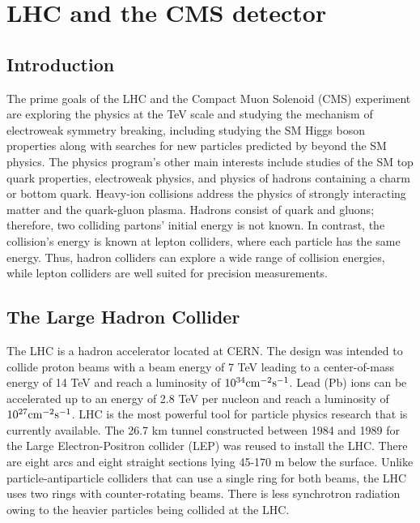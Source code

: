 %
%

\chapter{LHC and the CMS detector}
\label{chap:exper_setup}

\section{Introduction}

The prime goals of the LHC and the Compact Muon Solenoid (CMS) \cite{Chatrchyan:2008aa} experiment are exploring the physics at the TeV scale and studying the mechanism of electroweak symmetry breaking, including studying the SM Higgs boson properties along with searches for new particles predicted by beyond the SM physics. The physics program's other main interests include studies of the SM top quark properties, electroweak physics, and physics of hadrons containing a charm or bottom quark. Heavy-ion collisions address the physics of strongly interacting matter and the quark-gluon plasma. Hadrons consist of quark and gluons; therefore, two colliding partons' initial energy is not known. In contrast, the collision's energy is known at lepton colliders, where each particle has the same energy. Thus, hadron colliders can explore a wide range of collision energies, while lepton colliders are well suited for precision measurements.

\section{The Large Hadron Collider}
\label{sec:LHC}

The LHC is a hadron accelerator located at CERN. The design was intended to collide proton beams with a beam energy of 7 TeV leading to a center-of-mass energy \sqs of 14 TeV and reach a luminosity of $10^{34} \text{cm}^{-2}\text{s}^{-1}$. Lead (Pb) ions can be accelerated up to an energy of 2.8 TeV per nucleon and reach a luminosity of $10^{27} \text{cm}^{-2}\text{s}^{-1}$. LHC is the most powerful tool for particle physics research that is currently available. The 26.7 km tunnel constructed between 1984 and 1989 for the Large Electron-Positron collider (LEP) \cite{Electron-Positron:1997351} was reused to install the LHC. There are eight arcs and eight straight sections lying 45-170 m below the surface. Unlike particle-antiparticle colliders that can use a single ring for both beams, the LHC uses two rings with counter-rotating beams. There is less synchrotron radiation owing to the heavier particles being collided at the LHC.

